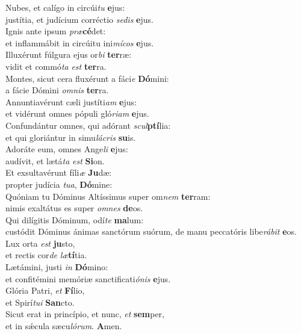 \evenverse Nubes, et calígo in circúi\textit{tu} \textbf{e}jus:~\*\\
\evenverse justítia, et judícium corréctio \textit{se}\textit{dis} \textbf{e}jus.\\
\oddverse Ignis ante ipsum \textit{præ}\textbf{cé}det:~\*\\
\oddverse et inflammábit in circúitu ini\textit{mí}\textit{cos} \textbf{e}jus.\\
\evenverse Illuxérunt fúlgura ejus or\textit{bi} \textbf{ter}ræ:~\*\\
\evenverse vidit et commó\textit{ta} \textit{est} \textbf{ter}ra.\\
\oddverse Montes, sicut cera fluxérunt a fáci\textit{e} \textbf{Dó}mini:~\*\\
\oddverse a fácie Dómini \textit{om}\textit{nis} \textbf{ter}ra.\\
\evenverse Annuntiavérunt cæli justíti\textit{am} \textbf{e}jus:~\*\\
\evenverse et vidérunt omnes pópuli gló\textit{ri}\textit{am} \textbf{e}jus.\\
\oddverse Confundántur omnes, qui adórant \textit{scul}\textbf{ptí}lia:~\*\\
\oddverse et qui gloriántur in simu\textit{lá}\textit{cris} \textbf{su}is.\\
\evenverse Adoráte eum, omnes Ange\textit{li} \textbf{e}jus:~\*\\
\evenverse audívit, et lætá\textit{ta} \textit{est} \textbf{Si}on.\\
\oddverse Et exsultavérunt fíli\textit{æ} \textbf{Ju}dæ:~\*\\
\oddverse propter judícia \textit{tu}\textit{a}, \textbf{Dó}mine:\\
\evenverse Quóniam tu Dóminus Altíssimus super om\textit{nem} \textbf{ter}ram:~\*\\
\evenverse nimis exaltátus es super \textit{om}\textit{nes} \textbf{de}os.\\
\oddverse Qui dilígitis Dóminum, odí\textit{te} \textbf{ma}lum:~\*\\
\oddverse custódit Dóminus ánimas sanctórum suórum, de manu peccatóris libe\textit{rá}\textit{bit} \textbf{e}os.\\
\evenverse Lux orta \textit{est} \textbf{ju}sto,~\*\\
\evenverse et rectis cor\textit{de} \textit{læ}\textbf{tí}tia.\\
\oddverse Lætámini, justi \textit{in} \textbf{Dó}mino:~\*\\
\oddverse et confitémini memóriæ sanctificati\textit{ó}\textit{nis} \textbf{e}jus.\\
\evenverse Glória Patri, \textit{et} \textbf{Fí}lio,~\*\\
\evenverse et Spirí\textit{tu}\textit{i} \textbf{San}cto.\\
\oddverse Sicut erat in princípio, et nunc, \textit{et} \textbf{sem}per,~\*\\
\oddverse et in sǽcula sæcu\textit{ló}\textit{rum}. \textbf{A}men.\\

